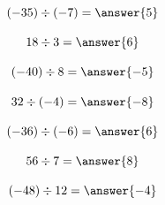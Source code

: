 \documentclass{ximera}
\begin{document}
\begin{problem}
\[
(-35) \div (-7) = \answer{5}
\]
\end{problem}

\begin{problem}
\[
18 \div 3 = \answer{6}
\]
\end{problem}

\begin{problem}
\[
(-40) \div 8 = \answer{-5}
\]
\end{problem}

\begin{problem}
\[
32 \div (-4) = \answer{-8}
\]
\end{problem}

\begin{problem}
\[
(-36) \div (-6) = \answer{6}
\]
\end{problem}

\begin{problem}
\[
56 \div 7 = \answer{8}
\]
\end{problem}

\begin{problem}
\[
(-48) \div 12 = \answer{-4}
\]
\end{problem}
\end{document}
